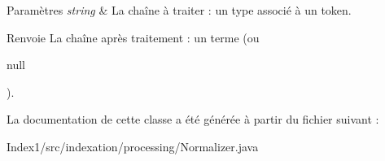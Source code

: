 \begin{DoxyParams}{Paramètres}
{\em string} & La chaîne à traiter \+: un type associé à un token. \\
\hline
\end{DoxyParams}
\begin{DoxyReturn}{Renvoie}
La chaîne après traitement \+: un terme (ou
\begin{DoxyCode}
null 
\end{DoxyCode}
 ). 
\end{DoxyReturn}


La documentation de cette classe a été générée à partir du fichier suivant \+:\begin{DoxyCompactItemize}
\item 
Index1/src/indexation/processing/Normalizer.\+java\end{DoxyCompactItemize}
